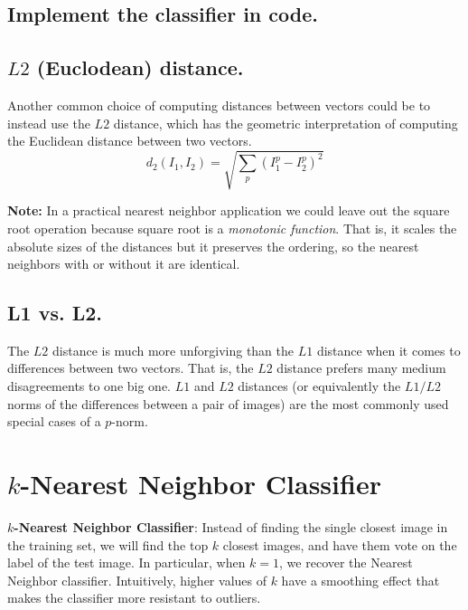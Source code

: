 \subsection{Implement the classifier in code.}

\subsection{$L2$ (Euclodean) distance.}
Another common choice of computing distances between vectors could be to instead use the $L2$ distance, which has the geometric interpretation of computing the Euclidean distance between two vectors.
$$d_2(I_1,I_2)=\sqrt{\sum_p(I_1^p-I_2^p)^2}$$

\textbf{Note:} In a practical nearest neighbor application we could leave out the square root operation because square root is a \emph{monotonic function}.
That is, it scales the absolute sizes of the distances but it preserves the ordering, so the nearest neighbors with or without it are identical.

\subsection{L1 vs. L2.} 
The $L2$ distance is much more unforgiving than the $L1$ distance when it comes to differences between two vectors. 
That is, the $L2$ distance prefers many medium disagreements to one big one.
$L1$ and $L2$ distances (or equivalently the $L1/L2$ norms of the differences between a pair of images) are the most commonly used special cases of a $p$-norm. 

\section{$k$-Nearest Neighbor Classifier}

\textbf{$k$-Nearest Neighbor Classifier}: Instead of finding the single closest image in the training set, we will find the top $k$ closest images, and have them vote on the label of the test image. 
In particular, when $k = 1$, we recover the Nearest Neighbor classifier. 
Intuitively, higher values of $k$ have a smoothing effect that makes the classifier more resistant to outliers.

